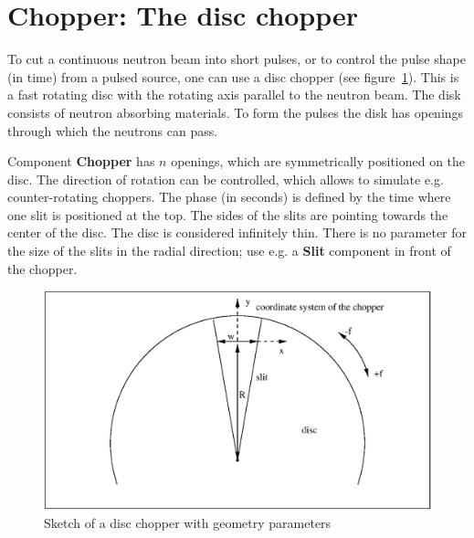
\section{Chopper: The disc chopper}
\label{s:chopper}


To cut a continuous neutron beam into short pulses, or to control
the pulse shape (in time) from a pulsed source, one can use a disc
chopper (see figure~\ref{f:chopper1}). This is a fast rotating disc with the
rotating axis parallel to the neutron beam. The disk consists of neutron
absorbing materials. To form the pulses the disk has openings through which
the neutrons can pass.

Component {\bf Chopper} has $n$ openings, which are
symmetrically positioned on the disc. The direction of rotation can be controlled, 
which allows to simulate e.g. counter-rotating choppers. 
The phase (in seconds) is defined by the time 
where one slit is positioned at the top. 
The sides of the slits are pointing towards the center of the disc.
The disc is considered infinitely thin.  There is no parameter for the
size of the slits in the radial direction;
use e.g. a {\bf Slit} component in front of the chopper.

\begin{figure}[ht]
\includegraphics[width=0.8\linewidth]{figures/Chopper.eps}
\caption{Sketch of a disc chopper with geometry parameters} 
\label{f:chopper1}
\end{figure}


%

